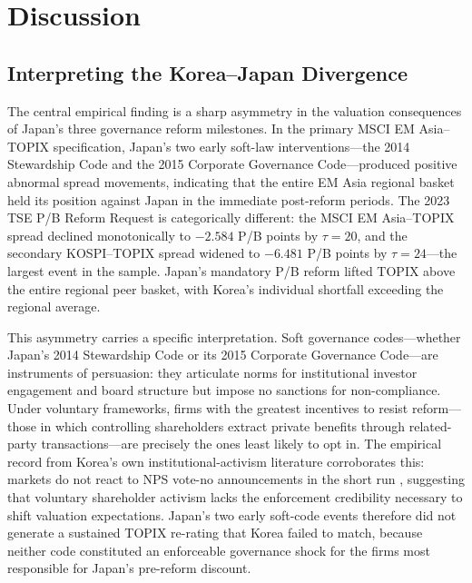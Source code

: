 \section{Discussion}

\subsection{Interpreting the Korea--Japan Divergence}

The central empirical finding is a sharp asymmetry in the valuation consequences of Japan's three governance reform milestones. In the primary MSCI EM Asia--TOPIX specification, Japan's two early soft-law interventions---the 2014 Stewardship Code and the 2015 Corporate Governance Code---produced positive abnormal spread movements, indicating that the entire EM Asia regional basket held its position against Japan in the immediate post-reform periods. The 2023 TSE P/B Reform Request is categorically different: the MSCI EM Asia--TOPIX spread declined monotonically to $-2.584$ P/B points by $\tau = 20$, and the secondary KOSPI--TOPIX spread widened to $-6.481$ P/B points by $\tau = 24$---the largest event in the sample. Japan's mandatory P/B reform lifted TOPIX above the entire regional peer basket, with Korea's individual shortfall exceeding the regional average.

This asymmetry carries a specific interpretation. Soft governance codes---whether Japan's 2014 Stewardship Code or its 2015 Corporate Governance Code---are instruments of persuasion: they articulate norms for institutional investor engagement and board structure but impose no sanctions for non-compliance. Under voluntary frameworks, firms with the greatest incentives to resist reform---those in which controlling shareholders extract private benefits through related-party transactions---are precisely the ones least likely to opt in. The empirical record from Korea's own institutional-activism literature corroborates this: markets do not react to NPS vote-no announcements in the short run \citep{kim_nps_governance_firm_value}, suggesting that voluntary shareholder activism lacks the enforcement credibility necessary to shift valuation expectations. Japan's two early soft-code events therefore did not generate a sustained TOPIX re-rating that Korea failed to match, because neither code constituted an enforceable governance shock for the firms most responsible for Japan's pre-reform discount.

